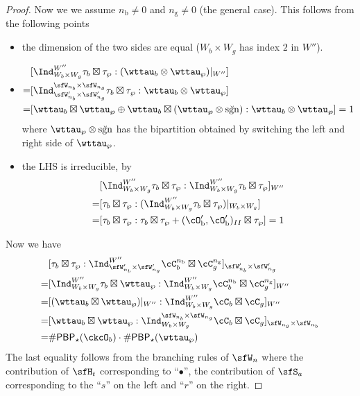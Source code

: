 \documentclass[12pt,a4paper]{amsart}
\newcommand{\sgn}{\operatorname{sgn}}
\numberwithin{equation}{section}
\theoremstyle{remark}
\def\brsgn{\breve{\sgn}}
\def\nbb{n_{\mathrm b}}
\def\ngg{n_{\mathrm g}}
\def\PBP{\mathsf{PBP}}
\def\cOpb{\cO'_{\mathrm b}}
\begin{document}
\begin{proof}
{    Now we we assume $\nbb\neq 0$ and $\ngg\neq 0$ (the general case). This
    follows from the following points
    \begin{itemize}
      \item the dimension of the two sides are equal ($W_{b}\times W_{g}$ has
            index $2$ in $W''$).
      \item
            \[
            \begin{split}
              &[\Ind_{W_{b}\times W_{g}}^{W''}\tau_{b}\boxtimes \tau_{\wp}:(\wttau_{b}\otimes \wttau_{\wp})|_{W''}] \\
              =& [\Ind_{\sfW'_{n_{b}}\times \sfW'_{n_{g}}}^{\sfW_{n_{b}}\times \sfW_{n_{g}}}\tau_{b}\boxtimes \tau_{\wp}:\wttau_{b}\otimes \wttau_{\wp}]\\
              =& [\wttau_{b}\boxtimes \wttau_{\wp} \oplus \wttau_{b}\boxtimes (\wttau_{\wp}\otimes \brsgn):\wttau_{b}\otimes \wttau_{\wp}] =1\\
            \end{split}
            \]
            where $\wttau_{\wp}\otimes \brsgn$ has the bipartition obtained by
            switching the left and right side of $\wttau_{\wp}$.
      \item the LHS is irreducible, by
            \[
            \begin{split}
              & [\Ind_{W_{b}\times W_{g}}^{W''}\tau_{b}\boxtimes \tau_{\wp}:
              \Ind_{W_{b}\times W_{g}}^{W''}\tau_{b}\boxtimes \tau_{\wp}]_{W''}\\
              =&  [\tau_{b}\boxtimes \tau_{\wp} : (\Ind_{W_{b}\times W_{g}}^{W''}\tau_{b}\boxtimes \tau_{\wp})|_{W_{b}\times W_{g}}]\\
              =& [\tau_{b}\boxtimes \tau_{\wp} : \tau_{b}\boxtimes \tau_{\wp} + (\cOpb,\cOpb)_{II} \boxtimes \tau_{\wp} ] = 1
            \end{split}
            \]
    \end{itemize}
  }

  Now we have
  \[
    \begin{split}
      & [\tau_{b}\boxtimes \tau_{\wp} :
      \Ind_{\sfW'_{n_{b}}\times \sfW'_{n_{g}}}^{W''} \cC_{b}^{\nbb} \boxtimes \cC_{g}^{\ngg}]_{\sfW'_{n_{b}}\times \sfW'_{n_{g}}}\\
      = & [\Ind_{W_{b}\times W_{g}}^{W''} \tau_{b}\boxtimes \wttau_{\wp} :
      \Ind_{W_{b}\times W_{g}}^{W''} \cC_{b}^{\nbb} \boxtimes \cC_{g}^{\ngg}]_{W''}\\
      = & [(\wttau_{b}\boxtimes \wttau_{\wp})|_{W''}:
      \Ind_{W_{b}\times W_{g}}^{W''} \cC_{b} \boxtimes \cC_{g}]_{W''}\\
      = & [\wttau_{b}\boxtimes \wttau_{\wp}:
      \Ind_{W_{b}\times W_{g}}^{\sfW_{n_{b}}\times \sfW_{n_{g}}} \cC_{b} \boxtimes \cC_{g}]_{\sfW_{n_{g}}\times \sfW_{n_{b}}}\\
      =& \# \PBP_{\star}(\ckcO_{b})\cdot \# \PBP_{\star}(\wttau_{\wp})
    \end{split}
  \]
  The last equality follows from the branching rules of $\sfW_{n}$ where the
  contribution of $\sfH_{t}$ corresponding to ``$\bullet$'',
  the contribution of $\sfS_{a}$ corresponding to the ``$s$'' on the left and
  ``$r$'' on the right.



\end{proof}
\end{document}
